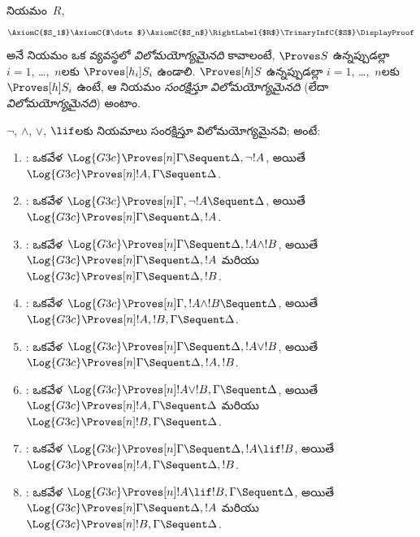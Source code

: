 \documentclass[../../../include/open-logic-section]{subfiles}
\begin{document}


\begin{defn}
నియమం~$R$,
\[
\AxiomC{$S_1$}
\AxiomC{$\dots$}
\AxiomC{$S_n$}
\RightLabel{$R$}
\TrinaryInfC{$S$}
\DisplayProof
\]
అనే నియమం ఒక వ్యవస్థలో \emph{విలోమయోగ్యమైనది} కావాలంటే, $\Proves S$ ఉన్నప్పుడల్లా $i = 1$, \dots,~$n$లకు $\Proves[h_i] S_i$ ఉండాలి. $\Proves[h] S$ ఉన్నప్పుడల్లా $i =
1$, \dots,~$n$లకు $\Proves[h] S_i$ ఉంటే, ఆ నియమం \emph{ సంరక్షిస్తూ విలోమయోగ్యమైనది} (లేదా \emph{ విలోమయోగ్యమైనది}) అంటాం.
\end{defn}

\begin{lem}
$\lnot$, $\land$, $\lor$, $\lif$లకు  నియమాలు  సంరక్షిస్తూ విలోమయోగ్యమైనవి; అంటే:
\begin{enumerate}
  \item \RightR{\lnot}: ఒకవేళ $\Log{G3c} \Proves[n] \Gamma \Sequent
  \Delta, \lnot !A$, అయితే $\Log{G3c} \Proves[n] !A, \Gamma \Sequent
  \Delta$.
  \item \LeftR{\lnot}: ఒకవేళ $\Log{G3c} \Proves[n] \Gamma, \lnot !A
  \Sequent \Delta$, అయితే $\Log{G3c} \Proves[n] \Gamma \Sequent \Delta,
  !A$.
  \item \RightR{\land}: ఒకవేళ $\Log{G3c} \Proves[n] \Gamma \Sequent
  \Delta, !A \land !B$, అయితే $\Log{G3c} \Proves[n] \Gamma \Sequent
  \Delta, !A$ మరియు $\Log{G3c} \Proves[n] \Gamma \Sequent
  \Delta, !B$.
  \item \LeftR{\land}: ఒకవేళ $\Log{G3c} \Proves[n] \Gamma, !A \land !B
  \Sequent \Delta$, అయితే $\Log{G3c} \Proves[n] !A, !B, \Gamma \Sequent
  \Delta$.
  \item \RightR{\lor}: ఒకవేళ $\Log{G3c} \Proves[n] \Gamma \Sequent
  \Delta, !A \lor !B$, అయితే $\Log{G3c} \Proves[n] \Gamma \Sequent
  \Delta, !A, !B$.
  \item \LeftR{\lor}: ఒకవేళ $\Log{G3c} \Proves[n] !A \lor !B, \Gamma \Sequent
  \Delta$, అయితే $\Log{G3c} \Proves[n] !A, \Gamma \Sequent
  \Delta$ మరియు $\Log{G3c} \Proves[n] !B, \Gamma \Sequent
  \Delta$.
  \item \RightR{\lif}: ఒకవేళ $\Log{G3c} \Proves[n] \Gamma \Sequent
  \Delta, !A \lif !B$, అయితే $\Log{G3c} \Proves[n] !A, \Gamma \Sequent
  \Delta, !B$.
  \item \LeftR{\lif}: ఒకవేళ $\Log{G3c} \Proves[n] !A \lif !B, \Gamma
  \Sequent \Delta$, అయితే $\Log{G3c} \Proves[n] \Gamma \Sequent \Delta,
  !A$ మరియు $\Log{G3c} \Proves[n] !B, \Gamma \Sequent \Delta$.
\end{enumerate}
\end{lem}
\end{document}
